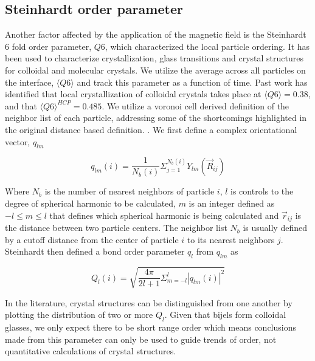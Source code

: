 \subsection{Steinhardt order parameter}
\label{section:steinhardt_order_parameter}

Another factor affected by the application of the magnetic field is the Steinhardt 6 fold order parameter, $Q6$, which characterized the local 
particle ordering. \cite{steinhardt_bond-orientational_1983} It has been used to characterize crystallization, glass transitions and crystal 
structures for colloidal and molecular crystals. We utilize the average across all particles on the interface, $\langle Q6 \rangle$ and track 
this parameter as a function of time. Past work has identified that local crystallization of colloidal crystals takes place at $\langle Q6 \rangle = 0.38$, 
and that $\langle Q6 \rangle^{HCP} = 0.485$. \cite{steinhardt_bond-orientational_1983, toxvaerd_role_2020, mickel_shortcomings_2013} We utilize a voronoi 
cell derived definition of the neighbor list of each particle, addressing some of the shortcomings highlighted in the original distance based definition. 
\cite{steinhardt_bond-orientational_1983, mickel_shortcomings_2013}. We first define a complex orientational vector, $q_{lm}$

\begin{equation}
q_{lm}(i) = \frac{1}{N_b(i)} \Sigma_{j = 1}^{N_b(i)} Y_{lm}(\vec{R}_{ij})
\end{equation}

Where $N_b$ is the number of nearest neighbors of particle $i$, $l$ is controls to the degree of spherical harmonic to be calculated, $m$ is an integer 
defined as $-l \leq m \leq l$ that defines which spherical harmonic is being calculated and $\vec{r}_{ij}$ is the distance between two particle centers. 
The neighbor list $N_b$ is usually defined by a cutoff distance from the center of particle $i$ to its nearest neighbors $j$. Steinhardt then defined a 
bond order parameter $q_l$ from $q_{lm}$ as

\begin{equation}
Q_{l}(i) = \sqrt{\frac{4 \pi}{2l + 1} \Sigma_{m = -l}^{l} |q_{lm}(i)|^2}
\end{equation}

In the literature, crystal structures can be distinguished from one another by plotting the distribution of two or more $Q_{l}$. 
\cite{lechner_accurate_2008, mickel_shortcomings_2013} Given that bijels form colloidal glasses, we only expect there to be
short range order which means conclusions made from this parameter can only be used to guide trends of order, not quantitative 
calculations of crystal structures.



